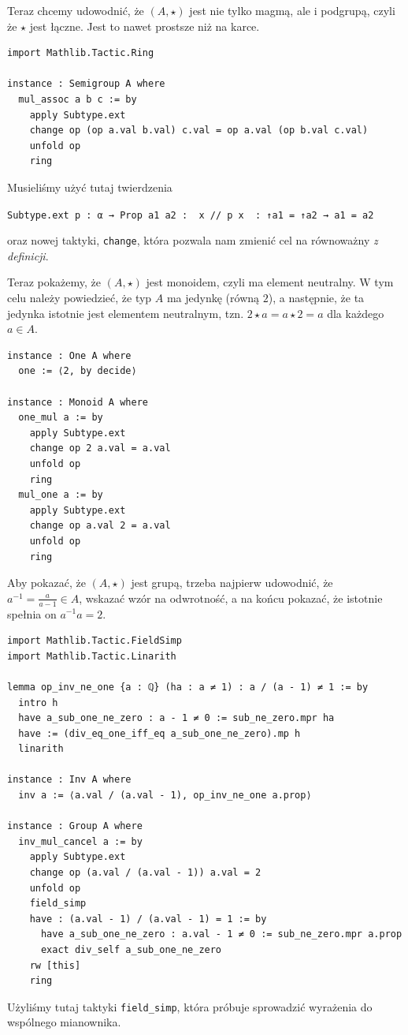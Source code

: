 \documentclass[polish,pretty,bibliography=totocnumbered]{angav}
\newcommand{\Lean}[1]{\texttt{#1}}
\newcommand{\centerLean}[2][]{\begin{center}\Lean{#2}#1\end{center}}
\begin{document}
Teraz chcemy udowodnić, że $(A, \star)$ jest nie tylko magmą, ale i podgrupą, czyli że $\star$ jest łączne. Jest to nawet prostsze niż na karce.
\begin{verbatim}
import Mathlib.Tactic.Ring

instance : Semigroup A where
  mul_assoc a b c := by
    apply Subtype.ext
    change op (op a.val b.val) c.val = op a.val (op b.val c.val)
    unfold op
    ring
\end{verbatim}
Musieliśmy użyć tutaj twierdzenia
\centerLean{Subtype.ext {p : α → Prop} {a1 a2 : { x // p x }} : ↑a1 = ↑a2 → a1 = a2}
oraz nowej taktyki, \Lean{change}, która pozwala nam zmienić cel na równoważny \emph{z definicji}.

Teraz pokażemy, że $(A, \star)$ jest monoidem, czyli ma element neutralny. W tym celu należy powiedzieć, że typ $A$ ma jedynkę (równą $2$), a następnie, że ta jedynka istotnie jest elementem neutralnym, tzn. $2 \star a = a \star 2 = a$ dla każdego $a \in A$.
\begin{verbatim}
instance : One A where
  one := ⟨2, by decide⟩

instance : Monoid A where
  one_mul a := by
    apply Subtype.ext
    change op 2 a.val = a.val
    unfold op
    ring
  mul_one a := by
    apply Subtype.ext
    change op a.val 2 = a.val
    unfold op
    ring
\end{verbatim}

Aby pokazać, że $(A, \star)$ jest grupą, trzeba najpierw udowodnić, że $a^{-1} = \frac{a}{a - 1} \in A$, wskazać wzór na odwrotność, a na końcu pokazać, że istotnie spełnia on $a^{-1}a = 2$.
\begin{verbatim}
import Mathlib.Tactic.FieldSimp
import Mathlib.Tactic.Linarith

lemma op_inv_ne_one {a : ℚ} (ha : a ≠ 1) : a / (a - 1) ≠ 1 := by
  intro h
  have a_sub_one_ne_zero : a - 1 ≠ 0 := sub_ne_zero.mpr ha
  have := (div_eq_one_iff_eq a_sub_one_ne_zero).mp h
  linarith

instance : Inv A where
  inv a := ⟨a.val / (a.val - 1), op_inv_ne_one a.prop⟩

instance : Group A where
  inv_mul_cancel a := by
    apply Subtype.ext
    change op (a.val / (a.val - 1)) a.val = 2
    unfold op
    field_simp
    have : (a.val - 1) / (a.val - 1) = 1 := by
      have a_sub_one_ne_zero : a.val - 1 ≠ 0 := sub_ne_zero.mpr a.prop
      exact div_self a_sub_one_ne_zero
    rw [this]
    ring
\end{verbatim}
Użyliśmy tutaj taktyki \Lean{field_simp}, która próbuje sprowadzić wyrażenia do wspólnego mianownika.
\end{document}
